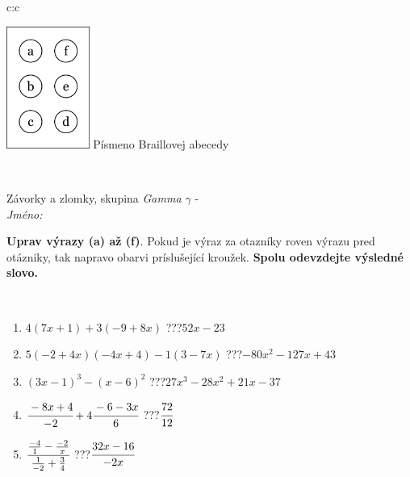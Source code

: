\documentclass[10pt]{report}
\begin{document}
\begin{tabular}{c:c}
\begin{minipage}[c][104.5mm][t]{0.5\linewidth}
\begin{center}
\begin{minipage}{0.20\linewidth}
\begin{center}
\includegraphics[height=40mm]{../images/braille.png}
{\small Písmeno Braillovej abecedy}
\end{center}
\end{minipage}
\end{center}
\end{minipage}
\\ \hdashline
\begin{minipage}[c][104.5mm][t]{0.5\linewidth}
\begin{center}
\vspace{7mm}
{\huge Závorky a zlomky, skupina \textit{Gamma $\gamma$} -}\\[5mm]
\textit{Jméno:}\phantom{xxxxxxxxxxxxxxxxxxxxxxxxxxxxxxxxxxxxxxxxxxxxxxxxxxxxxxxxxxxxxxxxx}\\[5mm]
\begin{minipage}{0.95\linewidth}
\begin{center}
\textbf{Uprav výrazy (a) až (f)}. Pokud je výraz za otazníky roven výrazu pred otázniky, tak napravo obarvi príslušející kroužek. \textbf{Spolu odevzdejte výsledné slovo.}
\end{center}
\end{minipage}
\\[1mm]
\begin{minipage}{0.79\linewidth}
\begin{center}
\begin{varwidth}{\linewidth}
\begin{enumerate}
\normalsize
\item $4(7x+1)+3(-9+8x)$\quad \dotfill\; ???\;\dotfill \quad $52x-23$
\item $5(-2+4x)(-4x+4)-1(3-7x)$\quad \dotfill\; ???\;\dotfill \quad $-80x^2-127x+43$
\item $(3x-1)^3-(x-6)^2$\quad \dotfill\; ???\;\dotfill \quad $27x^3-28x^2+21x-37$
\item $\cfrac{-8x+4}{-2}+4\cfrac{-6-3x}{6}$\quad \dotfill\; ???\;\dotfill \quad $\cfrac{72}{12}$
\item $\cfrac{\frac{-4}{1}-\frac{-2}{x}}{\frac{1}{-2}+\frac{3}{4}}$\quad \dotfill\; ???\;\dotfill \quad $\cfrac{32x-16}{-2x}$

\end{enumerate}
\end{varwidth}
\end{center}
\end{minipage}
\end{center}
\end{minipage}
\end{tabular}
\end{document}
